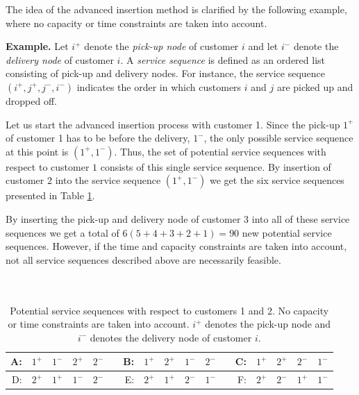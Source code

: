 \documentclass[dissertation,draft*]{aaltoseries}
\begin{document}
The idea of the advanced insertion method is 
clarified by the following example, where no
capacity or time constraints are taken into account. 

\noindent \textbf{Example.}
Let $i^{+}$ denote the \emph{pick-up node} of customer $i$ and let $i^{-}$ denote 
the \emph{delivery node} of customer $i$.
A \emph{service sequence} is defined as an ordered list consisting of pick-up and delivery nodes.
For instance, the service sequence $( i^{+},  j^{+}, j^{-}, i^{-})$ indicates the order
in which customers $i$ and $j$ are picked up and dropped off.

Let us start the advanced insertion process with customer 1.
Since the pick-up $1^{+}$ of customer 1 has to be before the delivery, $1^{-}$, 
the only possible service sequence at this point is $( 1^{+},  1^{-})$. Thus, the 
set of potential service sequences with respect to customer $1$ consists of this single service sequence. 
By insertion of customer $2$ into the service sequence $( 1^{+}, 1^{-})$ we get the six 
service sequences presented in Table \ref{ykskakstaulukko01}.

By inserting the pick-up and delivery node of customer $3$ into all of these service sequences we get a total
of $6(5+4+3+2+1) = 90$ new potential service sequences. However, if the time and capacity
constraints are taken into account, not all service sequences described above are necessarily feasible.
\\ \
\\ \
\\

\begin{table}[ht] 
\caption{Potential service sequences with respect to customers 1 and 2. 
No capacity or time constraints are taken into account. 
$i^{+}$ denotes the pick-up node and $i^{-}$ denotes
the delivery node of customer $i$.} 
\centering     
\begin{tabular}{|rrrrrr|rrrrrr|rrrrr|}  
\hline  %
A: & $ 1^{+} $ & $  1^{-} $ & $  2^{+} $ & $  2^{-} $ & & 
B: & $ 1^{+} $ & $  2^{+} $ & $  1^{-} $ & $  2^{-} $ & & 
C: & $ 1^{+} $ & $  2^{+} $ & $  2^{-} $ & $  1^{-} $ \\ %
\hline  %
D: & $ 2^{+} $ & $  1^{+} $ & $  1^{-} $ & $  2^{-} $ & & 
E: & $ 2^{+} $ & $  1^{+} $ & $ 2^{-} $ & $  1^{-} $ & & 
F: & $ 2^{+} $ & $  2^{-} $ & $  1^{+} $ & $  1^{-} $ \\ %
\hline                      
\end{tabular} 
\label{ykskakstaulukko01} 
\end{table} 
\end{document}
